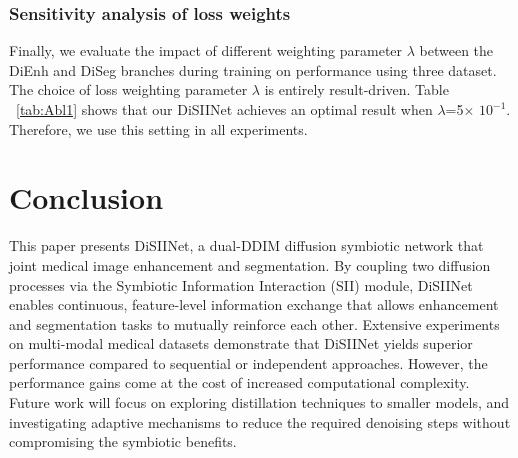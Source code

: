 \documentclass{article}
\begin{document}
\subsubsection{Sensitivity analysis of loss weights}


\begin{table}[h]
\centering
{}
\renewcommand{\tablename}{Table}
\caption{\normalfont\normalsize Ablation study of weighting parameter $\lambda$.}
\label{tab:Abl1}
\vspace{-1em}
\end{table}

Finally, we evaluate the impact of different weighting parameter $\lambda$ between the DiEnh and DiSeg branches during training on performance using three dataset. The choice of loss weighting parameter $\lambda$ is entirely result-driven. Table ~\ref{tab:Abl1} shows that our DiSIINet achieves an optimal result when $\lambda$=5$\times$ $10^{-1}$. Therefore, we use this setting in all experiments.

\section{Conclusion}
This paper presents DiSIINet, a dual-DDIM diffusion symbiotic network that joint medical image enhancement and segmentation. By coupling two diffusion processes via the Symbiotic Information Interaction (SII) module, DiSIINet enables continuous, feature-level information exchange that allows enhancement and segmentation tasks to mutually reinforce each other. Extensive experiments on multi-modal medical datasets demonstrate that DiSIINet yields superior performance compared to sequential or independent approaches. However, the performance gains come at the cost of increased computational complexity. Future work will focus on exploring distillation techniques to smaller models, and investigating adaptive mechanisms to reduce the required denoising steps without compromising the symbiotic benefits.
\end{document}
